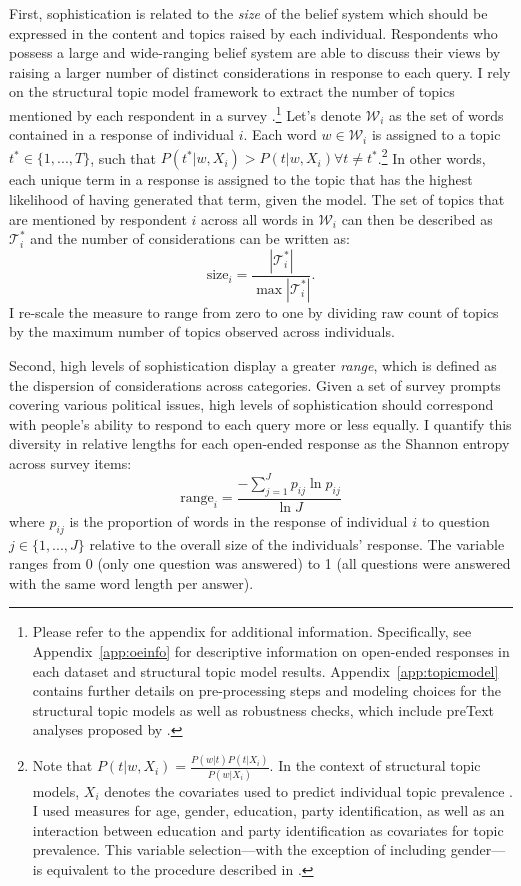 First, sophistication is related to the \textit{size} of the belief system which should be expressed in the content and topics raised by each individual. Respondents who possess a large and wide-ranging belief system are able to discuss their views by raising a larger number of distinct considerations in response to each query. I rely on the structural topic model framework to extract the number of topics mentioned by each respondent in a survey \citep{roberts2014structural}.\footnote{Please refer to the appendix for additional information. Specifically, see Appendix~\ref{app:oeinfo} for descriptive information on open-ended responses in each dataset and structural topic model results. Appendix~\ref{app:topicmodel} contains further details on pre-processing steps and modeling choices for the structural topic models as well as robustness checks, which include preText analyses proposed by \citet{denny2018text}.} Let's denote $\mathcal{W}_i$ as the set of words contained in a response of individual $i$. Each word $w\in\mathcal{W}_i$ is assigned to a topic $t^* \in \{1,...,T\} $, such that $P(t^*|w,X_i) > P(t|w,X_i) \forall t\neq t^*$.\footnote{Note that $P(t|w,X_i)=\tfrac{P(w|t)P(t|X_i)}{P(w|X_i)}$. In the context of structural topic models, $X_i$ denotes the covariates used to predict individual topic prevalence \citep[see][for details]{roberts2014structural}. I used measures for age, gender, education, party identification, as well as an interaction between education and party identification as covariates for topic prevalence. This variable selection---with the exception of including gender---is equivalent to the procedure described in \citet{roberts2014structural}.} In other words, each unique term in a response is assigned to the topic that has the highest likelihood of having generated that term, given the model. The set of topics that are mentioned by respondent $i$ across all words in $\mathcal{W}_i$ can then be described as $\mathcal{T}^*_i$ and the number of considerations can be written as:
\begin{equation}
\text{size}_i = \dfrac{|\mathcal{T}^*_i|}{\max|\mathcal{T}^*_i|}.
\end{equation}
I re-scale the measure to range from zero to one by dividing raw count of topics by the maximum number of topics observed across individuals.

Second, high levels of sophistication display a greater \textit{range}, which is defined as the dispersion of considerations across categories. Given a set of survey prompts covering various political issues, high levels of sophistication should correspond with people's ability to respond to each query more or less equally. I quantify this diversity in relative lengths for each open-ended response as the Shannon entropy across survey items:
\begin{equation}
\text{range}_i = \dfrac{-\sum_{j=1}^J p_{ij} \ln p_{ij}}{\ln J}
\end{equation}
where $p_{ij}$ is the proportion of words in the response of individual $i$ to question $j\in \{1,...,J\}$ relative to the overall size of the individuals' response. The variable ranges from 0 (only one question was answered) to 1 (all questions were answered with the same word length per answer).

